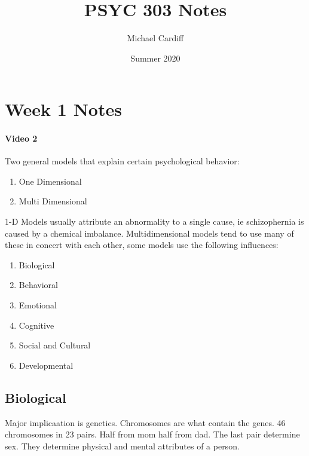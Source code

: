 \documentclass[12pt]{article}
\title{PSYC 303 Notes}
\author{Michael Cardiff}
\date{Summer 2020}
\begin{document}
\maketitle
\section{Week 1 Notes}
\paragraph{Video 2}
Two general models that explain certain psychological behavior:
\begin{enumerate}
\item One Dimensional
\item Multi Dimensional
\end{enumerate}
1-D Models usually attribute an abnormality to a single cause, ie
schizophernia is caused by a chemical imbalance. Multidimensional
models tend to use many of these in concert with each other, some
models use the following influences:
\begin{enumerate}
\item Biological
\item Behavioral
\item Emotional
\item Cognitive
\item Social and Cultural
\item Developmental
\end{enumerate}
\subsection{Biological}
Major implicaation is genetics. Chromosomes are what contain the
genes. 46 chromosomes in 23 pairs. Half from mom half from dad. The
last pair determine sex. They determine physical and mental attributes
of a person.
\end{document}
